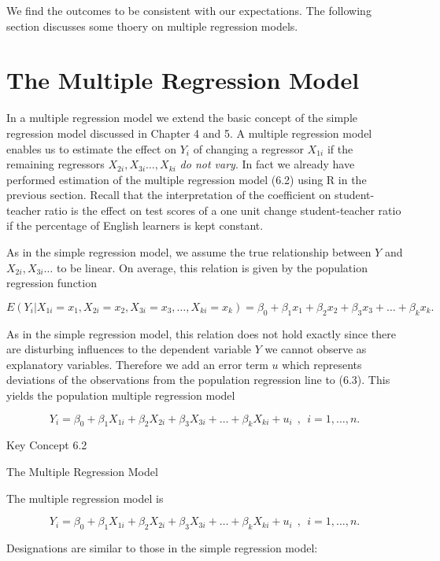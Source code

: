 \documentclass[]{book}
\theoremstyle{definition}
\theoremstyle{definition}
\theoremstyle{definition}
\theoremstyle{remark}
\begin{document}
We find the outcomes to be consistent with our expectations. The
following section discusses some thoery on multiple regression models.

\section{The Multiple Regression
Model}\label{the-multiple-regression-model}

In a multiple regression model we extend the basic concept of the simple
regression model discussed in Chapter 4 and 5. A multiple regression
model enables us to estimate the effect on \(Y_i\) of changing a
regressor \(X_{1i}\) if the remaining regressors
\(X_{2i},X_{3i}\dots,X_{ki}\) \emph{do not vary}. In fact we already
have performed estimation of the multiple regression model (6.2) using R
in the previous section. Recall that the interpretation of the
coefficient on student-teacher ratio is the effect on test scores of a
one unit change student-teacher ratio if the percentage of English
learners is kept constant.

As in the simple regression model, we assume the true relationship
between \(Y\) and \(X_{2i},X_{3i}\dots\) to be linear. On average, this
relation is given by the population regression function

\[ E(Y_i\vert X_{1i}=x_1, X_{2i}=x_2,  X_{3i}=x_3,\dots, X_{ki}=x_k) = \beta_0 + \beta_1 x_1 + \beta_2 x_2 + \beta_3 x_3 + \dots + \beta_k x_k. \tag{6.3} \]

As in the simple regression model, this relation does not hold exactly
since there are disturbing influences to the dependent variable \(Y\) we
cannot observe as explanatory variables. Therefore we add an error term
\(u\) which represents deviations of the observations from the
population regression line to (6.3). This yields the population multiple
regression model

\[ Y_i = \beta_0 + \beta_1 X_{1i} + \beta_2 X_{2i} + \beta_3 X_{3i} + \dots + \beta_k X_{ki} + u_i \ \ , \ \ i=1,\dots,n. \tag{6.4} \]

Key Concept 6.2

The Multiple Regression Model

The multiple regression model is

\[ Y_i = \beta_0 + \beta_1 X_{1i} + \beta_2 X_{2i} + \beta_3 X_{3i} + \dots + \beta_k X_{ki} + u_i \ \ , \ \ i=1,\dots,n.  \]

Designations are similar to those in the simple regression model:
\end{document}
